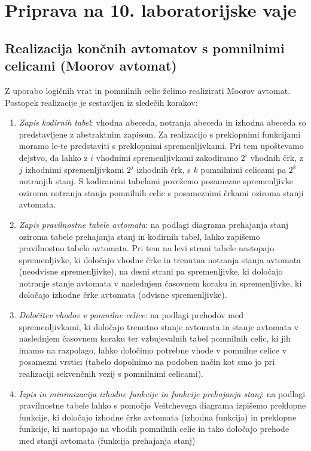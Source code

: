 \chapter{Priprava na 10. laboratorijske vaje}
\section{Realizacija končnih avtomatov s pomnilnimi celicami (Moorov avtomat)}

Z uporabo logičnih vrat in pomnilnih celic želimo realizirati Moorov avtomat. Postopek realizacije je sestavljen iz sledečih korakov:
\begin{enumerate}
\item \emph{Zapis kodirnih tabel}: vhodna abeceda, notranja abeceda in izhodna abeceda so predstavljene z abstraktnim zapisom. Za realizacijo s preklopnimi funkcijami moramo le-te predstaviti s preklopnimi spremenljivkami. Pri tem upoštevamo dejstvo, da lahko z $i$ vhodnimi spremenljivkami zakodiramo $2^i$ vhodnih črk, z $j$ izhodnimi spremenljivkami $2^j$ izhodnih črk, s $k$ pomnilnimi celicami pa $2^k$ notranjih stanj. S kodiranimi tabelami povežemo posamezne spremenljivke oziroma notranja stanja pomnilnih celic s posameznimi črkami oziroma stanji avtomata.
\item \emph{Zapis pravilnostne tabele avtomata}: na podlagi diagrama prehajanja stanj oziroma tabele prehajanja stanj in kodirnih tabel, lahko zapišemo pravilnostno tabelo avtomata. Pri tem na levi strani tabele nastopajo spremenljivke, ki določajo vhodne črke in trenutna notranja stanja avtomata (neodvisne spremenljivke), na desni strani pa spremenljivke, ki določajo notranje stanje avtomata v naslednjem časovnem koraku in spremenljivke, ki določajo izhodne črke avtomata (odvisne spremenljivke).
\item \emph{Določitev vhodov v pomnilne celice}: na podlagi prehodov med spremenljivkami, ki določajo trenutno stanje avtomata in stanje avtomata v naslednjem časovnem koraku ter vzbujevalnih tabel pomnilnih celic, ki jih imamo na razpolago, lahko določimo potrebne vhode v pomnilne celice v posamezni vrstici (tabelo dopolnimo na podoben način kot smo jo pri realizaciji sekvenčnih vezij s pomnilnimi celicami). 
\item \emph{Izpis in minimizacija izhodne funkcije in funkcije prehajanja stanj}: na podlagi pravilnostne tabele lahko s pomočjo Veitchevega diagrama izpišemo preklopne funkcije, ki določajo izhodne črke avtomata (izhodna funkcija) in preklopne funkcije, ki nastopajo na vhodih pomnilnih celic in tako določajo prehode med stanji avtomata (funkcija prehajanja stanj)
\end{enumerate}

